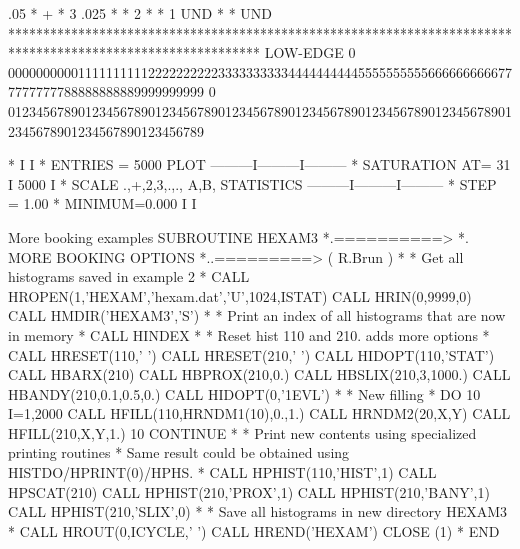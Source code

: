 \begin{Listing}
      .05   *                                                                    +                                     *   3
      .025  *                                                                                                          *   2
            *                                                                                                          *   1
   UND      *                                                                                                          * UND
            ************************************************************************************************************
 LOW-EDGE   0   0000000000111111111122222222223333333333444444444455555555556666666666777777777788888888889999999999
            0   0123456789012345678901234567890123456789012345678901234567890123456789012345678901234567890123456789
 
  *                                                          I         I
  * ENTRIES =     5000                   PLOT       ---------I---------I---------
  * SATURATION  AT=           31                             I 5000    I
  * SCALE  .,+,2,3,.,., A,B,           STATISTICS   ---------I---------I---------
  * STEP = 1.00     * MINIMUM=0.000                          I         I
\end{Listing}
\newpage
\begin{XMPt}{More booking examples}
      SUBROUTINE HEXAM3
*.==========>
*.           MORE BOOKING OPTIONS
*..=========> ( R.Brun )
*
*             Get all histograms saved in example 2
*
      CALL HROPEN(1,'HEXAM','hexam.dat','U',1024,ISTAT)
      CALL HRIN(0,9999,0)
      CALL HMDIR('HEXAM3','S')
*
*             Print an index of all histograms that are now in memory
*
      CALL HINDEX
*
*             Reset hist 110 and 210.  adds more options
*
      CALL HRESET(110,' ')
      CALL HRESET(210,' ')
      CALL HIDOPT(110,'STAT')
      CALL HBARX(210)
      CALL HBPROX(210,0.)
      CALL HBSLIX(210,3,1000.)
      CALL HBANDY(210,0.1,0.5,0.)
      CALL HIDOPT(0,'1EVL')
*
*             New filling
*
      DO 10 I=1,2000
         CALL HFILL(110,HRNDM1(10),0.,1.)
         CALL HRNDM2(20,X,Y)
         CALL HFILL(210,X,Y,1.)
  10  CONTINUE
*
*             Print new contents using specialized printing routines
*             Same result could be obtained using HISTDO/HPRINT(0)/HPHS.
*
      CALL HPHIST(110,'HIST',1)
      CALL HPSCAT(210)
      CALL HPHIST(210,'PROX',1)
      CALL HPHIST(210,'BANY',1)
      CALL HPHIST(210,'SLIX',0)
*
*             Save all histograms in new directory HEXAM3
*
      CALL HROUT(0,ICYCLE,' ')
      CALL HREND('HEXAM')
      CLOSE (1)
*
      END
\end{XMPt}
